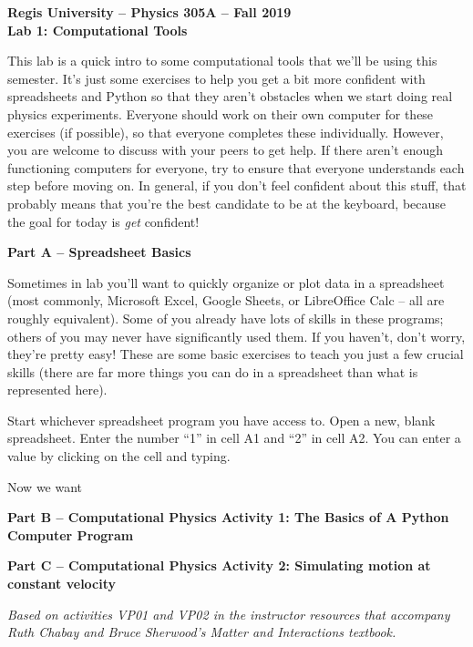 \documentclass[11pt]{article}
\begin{document}
\begin{center}
{\bf{Regis University -- Physics 305A -- Fall 2019}} \\
{\bf{Lab 1: Computational Tools}} \\
\medskip
\end{center}

This lab is a quick intro to some computational tools that we'll be using this semester. It's just some exercises to help you get a bit more confident with spreadsheets and Python so that they aren't obstacles when we start doing real physics experiments. Everyone should work on their own computer for these exercises (if possible), so that everyone completes these individually. However, you are welcome to discuss with your peers to get help. If there aren't enough functioning computers for everyone, try to ensure that everyone understands each step before moving on. In general, if you don't feel confident about this stuff, that probably means that you're the best candidate to be at the keyboard, because the goal for today is \textit{get} confident!

\begin{center}
{\bf{Part A -- Spreadsheet Basics}} 
\end{center}

Sometimes in lab you'll want to quickly organize or plot data in a spreadsheet (most commonly, Microsoft Excel, Google Sheets, or LibreOffice Calc -- all are roughly equivalent). Some of you already have lots of skills in these programs; others of you may never have significantly used them. If you haven't, don't worry, they're pretty easy! These are some basic exercises to teach you just a few crucial skills (there are far more things you can do in a spreadsheet than what is represented here). 

Start whichever spreadsheet program you have access to. Open a new, blank spreadsheet. Enter the number ``1'' in cell A1 and ``2'' in cell A2. You can enter a value by clicking on the cell and typing.

Now we want 

\medskip

\begin{center}
{\bf{Part B -- Computational Physics Activity 1: The Basics of A Python Computer Program}} 
\end{center}

\medskip 

\begin{center}
{\bf{Part C -- Computational Physics Activity 2: Simulating motion at constant velocity}} 

{\em{\tiny Based on activities VP01 and VP02 in the instructor resources that
 accompany Ruth Chabay and Bruce Sherwood's {\em Matter and Interactions} 
 textbook.}}
\end{center}
\end{document}
